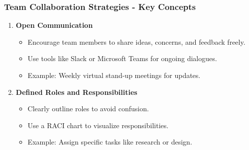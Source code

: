 \documentclass[aspectratio=169]{beamer}
\begin{document}
\begin{frame}[fragile]
    \frametitle{Team Collaboration Strategies - Key Concepts}
    \begin{enumerate}
        \item \textbf{Open Communication}
            \begin{itemize}
                \item Encourage team members to share ideas, concerns, and feedback freely.
                \item Use tools like Slack or Microsoft Teams for ongoing dialogues.
                \item Example: Weekly virtual stand-up meetings for updates.
            \end{itemize}
        \item \textbf{Defined Roles and Responsibilities}
            \begin{itemize}
                \item Clearly outline roles to avoid confusion.
                \item Use a RACI chart to visualize responsibilities.
                \item Example: Assign specific tasks like research or design.
            \end{itemize}
    \end{enumerate}
\end{frame}
\end{document}
